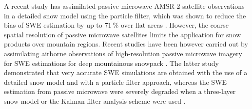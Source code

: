 \documentclass[utf8]{frontiersSCNS} %
\begin{document}
A recent study has assimilated passive microwave AMSR-2 satellite observations in a detailed snow model using the particle filter, which was shown to reduce the bias of SWE estimation by up to $71 \ \%$ over flat areas \citep{Larue_2018}. However, the coarse spatial resolution of passive microwave satellites limits the application for snow products over mountain regions. %
Recent studies have been however carried out by assimilating airborne observations of high-resolution passive microwave imagery for SWE estimations for deep mountainous snowpack \citep{Li_2017,Kim_2019}. The latter study demonstrated that very accurate SWE simulations are obtained with the use of a detailed snow model and with a particle filter approach, whereas the SWE estimation from passive microwave were severely degraded when a three-layer snow model or the Kalman filter analysis scheme were used \citep{Kim_2019}.
\end{document}
